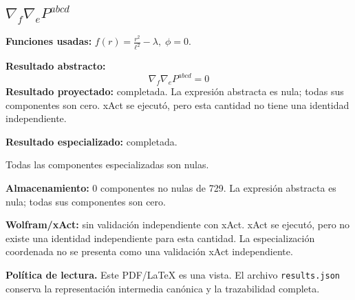 \documentclass[11pt]{article}
\begin{document}
\subsection*{$ \nabla_f\nabla_e P^{abcd} $}
\textbf{Funciones usadas:} $ f\!\left(r\right) = \frac{{r}^{2}}{{\ell}^{2}} - \lambda,\;\phi=0 $.\par
\textbf{Resultado abstracto:}
\begin{dmath*}[breakdepth={5}]
\nabla_f\nabla_e P^{abcd} = 0
\end{dmath*}
\textbf{Resultado proyectado:} completada. La expresión abstracta es nula; todas sus componentes son cero. xAct se ejecutó, pero esta cantidad no tiene una identidad independiente.\par
\textbf{Resultado especializado:} completada.\par
Todas las componentes especializadas son nulas.\par
\textbf{Almacenamiento:} 0 componentes no nulas de 729. La expresión abstracta es nula; todas sus componentes son cero.\par
\textbf{Wolfram/xAct:} sin validación independiente con xAct. xAct se ejecutó, pero no existe una identidad independiente para esta cantidad. La especialización coordenada no se presenta como una validación xAct independiente.\par\medskip
\bigskip\noindent\textbf{Política de lectura.} Este PDF/LaTeX es una vista. El archivo \texttt{results.json} conserva la representación intermedia canónica y la trazabilidad completa.
\end{document}

